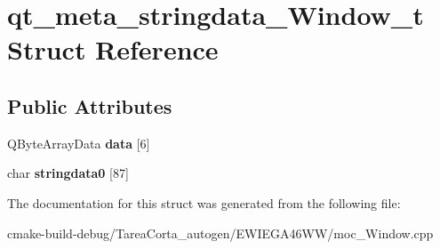 \hypertarget{structqt__meta__stringdata___window__t}{}\section{qt\+\_\+meta\+\_\+stringdata\+\_\+\+Window\+\_\+t Struct Reference}
\label{structqt__meta__stringdata___window__t}
\subsection*{Public Attributes}
\begin{DoxyCompactItemize}
\item 
Q\+Byte\+Array\+Data {\bfseries data} \mbox{[}6\mbox{]}\hypertarget{structqt__meta__stringdata___window__t_a303340fc1362b949e4b7da04ec304abb}{}\label{structqt__meta__stringdata___window__t_a303340fc1362b949e4b7da04ec304abb}

\item 
char {\bfseries stringdata0} \mbox{[}87\mbox{]}\hypertarget{structqt__meta__stringdata___window__t_a4561d6c660998c41f7e3f7bd766525cf}{}\label{structqt__meta__stringdata___window__t_a4561d6c660998c41f7e3f7bd766525cf}

\end{DoxyCompactItemize}


The documentation for this struct was generated from the following file\+:\begin{DoxyCompactItemize}
\item 
cmake-\/build-\/debug/\+Tarea\+Corta\+\_\+autogen/\+E\+W\+I\+E\+G\+A46\+W\+W/moc\+\_\+\+Window.\+cpp\end{DoxyCompactItemize}
